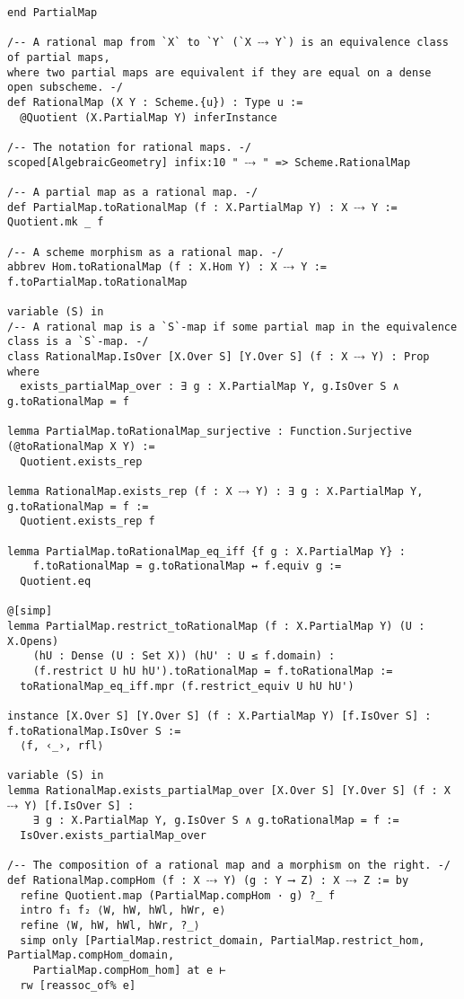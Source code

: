 \documentclass{article}
\begin{document}
\begin{lstlisting}[language=Lean, caption={RationalMap.lean}]
end PartialMap

/-- A rational map from `X` to `Y` (`X ⤏ Y`) is an equivalence class of partial maps,
where two partial maps are equivalent if they are equal on a dense open subscheme. -/
def RationalMap (X Y : Scheme.{u}) : Type u :=
  @Quotient (X.PartialMap Y) inferInstance

/-- The notation for rational maps. -/
scoped[AlgebraicGeometry] infix:10 " ⤏ " => Scheme.RationalMap

/-- A partial map as a rational map. -/
def PartialMap.toRationalMap (f : X.PartialMap Y) : X ⤏ Y := Quotient.mk _ f

/-- A scheme morphism as a rational map. -/
abbrev Hom.toRationalMap (f : X.Hom Y) : X ⤏ Y := f.toPartialMap.toRationalMap

variable (S) in
/-- A rational map is a `S`-map if some partial map in the equivalence class is a `S`-map. -/
class RationalMap.IsOver [X.Over S] [Y.Over S] (f : X ⤏ Y) : Prop where
  exists_partialMap_over : ∃ g : X.PartialMap Y, g.IsOver S ∧ g.toRationalMap = f

lemma PartialMap.toRationalMap_surjective : Function.Surjective (@toRationalMap X Y) :=
  Quotient.exists_rep

lemma RationalMap.exists_rep (f : X ⤏ Y) : ∃ g : X.PartialMap Y, g.toRationalMap = f :=
  Quotient.exists_rep f

lemma PartialMap.toRationalMap_eq_iff {f g : X.PartialMap Y} :
    f.toRationalMap = g.toRationalMap ↔ f.equiv g :=
  Quotient.eq

@[simp]
lemma PartialMap.restrict_toRationalMap (f : X.PartialMap Y) (U : X.Opens)
    (hU : Dense (U : Set X)) (hU' : U ≤ f.domain) :
    (f.restrict U hU hU').toRationalMap = f.toRationalMap :=
  toRationalMap_eq_iff.mpr (f.restrict_equiv U hU hU')

instance [X.Over S] [Y.Over S] (f : X.PartialMap Y) [f.IsOver S] : f.toRationalMap.IsOver S :=
  ⟨f, ‹_›, rfl⟩

variable (S) in
lemma RationalMap.exists_partialMap_over [X.Over S] [Y.Over S] (f : X ⤏ Y) [f.IsOver S] :
    ∃ g : X.PartialMap Y, g.IsOver S ∧ g.toRationalMap = f :=
  IsOver.exists_partialMap_over

/-- The composition of a rational map and a morphism on the right. -/
def RationalMap.compHom (f : X ⤏ Y) (g : Y ⟶ Z) : X ⤏ Z := by
  refine Quotient.map (PartialMap.compHom · g) ?_ f
  intro f₁ f₂ ⟨W, hW, hWl, hWr, e⟩
  refine ⟨W, hW, hWl, hWr, ?_⟩
  simp only [PartialMap.restrict_domain, PartialMap.restrict_hom, PartialMap.compHom_domain,
    PartialMap.compHom_hom] at e ⊢
  rw [reassoc_of% e]


\end{lstlisting}
\end{document}
